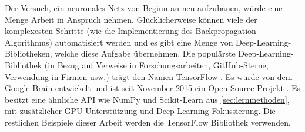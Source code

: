 Der Versuch, ein neuronales Netz von Beginn an neu aufzubauen,
würde eine Menge Arbeit in Anspruch nehmen.
Glücklicherweise können viele der komplexesten Schritte
(wie die Implementierung des Backpropagation-Algorithmus)
automatisiert werden und es gibt eine Menge von
Deep-Learning-Bibliotheken, welche diese Aufgabe übernehmen.
Die populärste Deep-Learning-Bibliothek (in Bezug auf Verweise in Forschungsarbeiten,
GitHub-Sterne, Verwendung in Firmen usw.) trägt den Namen TensorFlow
\parencite[376]{book:hands-on-ml}.
Es wurde von dem Google Brain entwickelt und ist seit November 2015
ein Open-Source-Projekt \parencite[376]{book:hands-on-ml}.
Es besitzt eine ähnliche API wie NumPy und Scikit-Learn
aus \autoref{sec:lernmethoden}, mit zusätzlicher
GPU Unterstützung und Deep Learning Fokussierung.
Die restlichen Beispiele dieser
Arbeit werden die TensorFlow Bibliothek verwenden.

